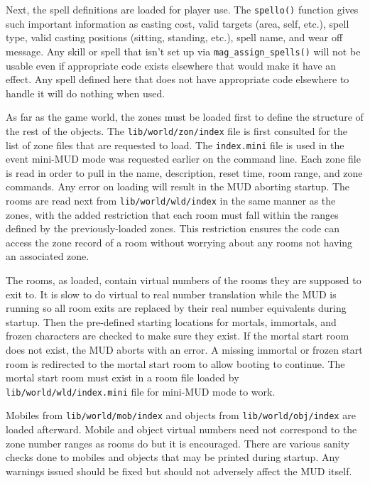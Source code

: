 \documentclass[11pt]{article}
\begin{document}
\par
Next, the spell definitions are loaded for player use.  The \texttt{spello()} function gives such important information as casting cost, valid targets (area, self, etc.), spell type, valid casting positions (sitting, standing, etc.), spell name, and wear off message.  Any skill or spell that isn't set up via \texttt{mag\_assign\_spells()} will not be usable even if appropriate code exists elsewhere that would make it have an effect.  Any spell defined here that does not have appropriate code elsewhere to handle it will do nothing when used.
\par
As far as the game world, the zones must be loaded first to define the structure of the rest of the objects.  The \texttt{lib/world/zon/index} file is first consulted for the list of zone files that are requested to load. The \texttt{index.mini} file is used in the event mini-MUD mode was requested
earlier on the command line.  Each zone file is read in order to pull in the name, description, reset time, room range, and zone commands.  Any error on loading will result in the MUD aborting startup.  The rooms are read next from \texttt{lib/world/wld/index} in the same manner as the zones, with the added restriction that each room must fall within the ranges defined by the previously-loaded zones.  This restriction ensures the code can access the zone record of a room without worrying about any rooms not having an associated zone.
\par
The rooms, as loaded, contain virtual numbers of the rooms they are supposed to exit to.  It is slow to do virtual to real number translation while the MUD is running so all room exits are replaced by their real number equivalents during startup.  Then the pre-defined starting locations for mortals, immortals, and frozen characters are checked to make sure they exist.  If the mortal start room does not exist, the MUD aborts with an error.  A missing immortal or frozen start room is redirected to the mortal start room to allow booting to continue.  The mortal start room must exist in a room file loaded by \texttt{lib/world/wld/index.mini} file for mini-MUD mode to work.
\par
Mobiles from \texttt{lib/world/mob/index} and objects from \texttt{lib/world/obj/index} are loaded afterward.  Mobile and object virtual numbers need not correspond to the zone number ranges as rooms do but it is encouraged.  There are various sanity checks done to mobiles and objects that may be printed during startup.  Any warnings issued should be fixed but should not adversely affect the MUD itself.
\end{document}
